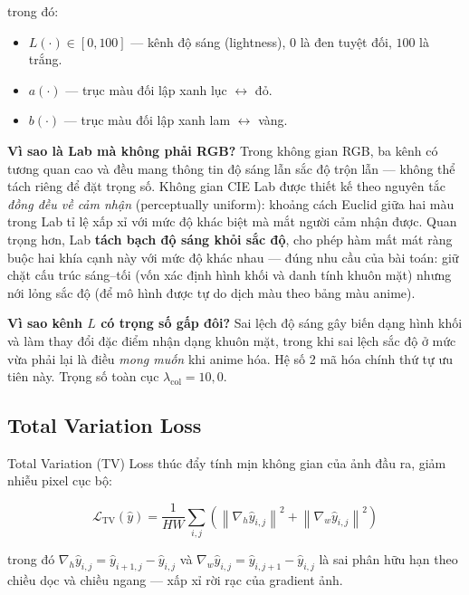 \noindent trong đó:
\begin{itemize}
    \item $L(\cdot) \in [0, 100]$ --- kênh độ sáng (lightness), $0$ là đen tuyệt đối, $100$ là trắng.
    \item $a(\cdot)$ --- trục màu đối lập xanh lục $\leftrightarrow$ đỏ.
    \item $b(\cdot)$ --- trục màu đối lập xanh lam $\leftrightarrow$ vàng.
\end{itemize}

\textbf{Vì sao là Lab mà không phải RGB?} Trong không gian RGB, ba kênh có tương quan cao và đều mang thông tin độ sáng lẫn sắc độ trộn lẫn --- không thể tách riêng để đặt trọng số. Không gian CIE Lab được thiết kế theo nguyên tắc \textit{đồng đều về cảm nhận} (perceptually uniform): khoảng cách Euclid giữa hai màu trong Lab tỉ lệ xấp xỉ với mức độ khác biệt mà mắt người cảm nhận được. Quan trọng hơn, Lab \textbf{tách bạch độ sáng khỏi sắc độ}, cho phép hàm mất mát ràng buộc hai khía cạnh này với mức độ khác nhau --- đúng nhu cầu của bài toán: giữ chặt cấu trúc sáng--tối (vốn xác định hình khối và danh tính khuôn mặt) nhưng nới lỏng sắc độ (để mô hình được tự do dịch màu theo bảng màu anime).

\textbf{Vì sao kênh $L$ có trọng số gấp đôi?} Sai lệch độ sáng gây biến dạng hình khối và làm thay đổi đặc điểm nhận dạng khuôn mặt, trong khi sai lệch sắc độ ở mức vừa phải lại là điều \textit{mong muốn} khi anime hóa. Hệ số 2 mã hóa chính thứ tự ưu tiên này. Trọng số toàn cục $\lambda_{\text{col}} = 10{,}0$.

\subsection{Total Variation Loss}
\label{subsec:tv_loss}

Total Variation (TV) Loss thúc đẩy tính mịn không gian của ảnh đầu ra, giảm nhiễu pixel cục bộ:

\begin{equation}
\label{eq:tv_loss}
\mathcal{L}_{\text{TV}}(\widehat{y}) = \frac{1}{HW} \sum_{i,j} \left( \left\|\nabla_h \widehat{y}_{i,j}\right\|^2 + \left\|\nabla_w \widehat{y}_{i,j}\right\|^2 \right)
\end{equation}

\noindent trong đó $\nabla_h \widehat{y}_{i,j} = \widehat{y}_{i+1,j} - \widehat{y}_{i,j}$ và $\nabla_w \widehat{y}_{i,j} = \widehat{y}_{i,j+1} - \widehat{y}_{i,j}$ là sai phân hữu hạn theo chiều dọc và chiều ngang --- xấp xỉ rời rạc của gradient ảnh.

